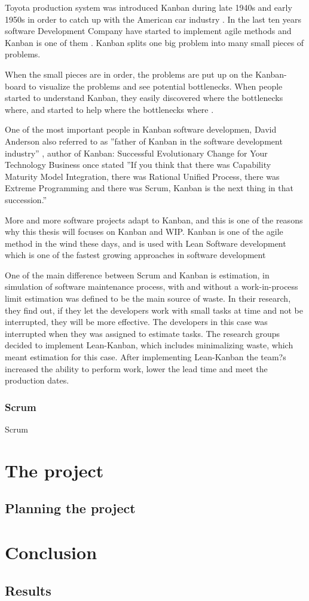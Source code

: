 \documentclass[UKenglish]{ifimaster}  %
\begin{document}
Toyota production system was introduced Kanban during late 1940s and early 1950s in order to catch up with the American car industry \parencite{ono1988toyota} . In the last ten years software Development Company have started to implement agile methods and Kanban is one of them \parencite{Conboy}.  Kanban splits one big problem into many small pieces of problems.

When the small pieces are in order, the problems are put up on the Kanban-board to visualize the problems and see potential bottlenecks. When people started to understand Kanban, they easily discovered where the bottlenecks where, and started to help where the bottlenecks where \parencite{Shinkle}.

One of the most important people in Kanban software developmen, David Anderson  also referred to as ''father of Kanban in the software development industry''  \parencite{InfoQ:2013:May:Online}, author of Kanban: Successful Evolutionary Change for Your Technology Business once stated ''If you think that there was Capability Maturity Model Integration, there was Rational Unified Process, there was Extreme Programming and there was Scrum, Kanban is the next thing in that succession.''   \parencite{InfoQ} 

More and more software projects adapt to Kanban, and this is one of the reasons why this thesis will focuses on Kanban and WIP.
Kanban is one of the agile method in the wind these days, and is used with Lean Software development which is one of the fastest growing approaches in software development \parencite{DavidAnderson}

One of the main difference between Scrum and Kanban is estimation, in simulation of software maintenance process, with and without a work-in-process limit \parencite{SMR:SMR1599} estimation was defined to be the main source of waste. In their research, they find out, if they let the developers work with small tasks at time and not be interrupted, they will be more effective. The developers in this case was interrupted when they was assigned to estimate tasks. The research groups decided to implement Lean-Kanban, which includes minimalizing waste, which meant estimation for this case. After implementing Lean-Kanban the team?s increased the ability to perform work, lower the lead time and meet the production dates.

\section {Scrum}
Scrum \parencite{Scrum}
\part{The project}                    %

\chapter{Planning the project}        %


\part{Conclusion}                     %

\chapter{Results}                     %


\backmatter{}
\printbibliography
\end{document}
